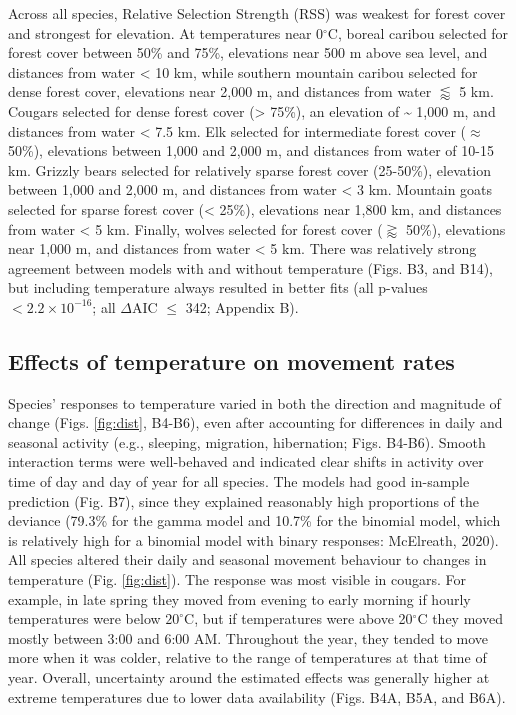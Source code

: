 \documentclass[
  12pt,
]{article}
\begin{document}
Across all species, Relative Selection Strength (RSS) was weakest for forest cover and strongest for elevation. At temperatures near 0\(^\circ\)C, boreal caribou selected for forest cover between 50\% and 75\%, elevations near 500 m above sea level, and distances from water \textless{} 10 km, while southern mountain caribou selected for dense forest cover, elevations near 2,000 m, and distances from water \(\lessapprox\) 5 km. Cougars selected for dense forest cover (\textgreater{} 75\%), an elevation of \textasciitilde{} 1,000 m, and distances from water \textless{} 7.5 km. Elk selected for intermediate forest cover (\(\approx\) 50\%), elevations between 1,000 and 2,000 m, and distances from water of 10-15 km. Grizzly bears selected for relatively sparse forest cover (25-50\%), elevation between 1,000 and 2,000 m, and distances from water \textless{} 3 km. Mountain goats selected for sparse forest cover (\textless{} 25\%), elevations near 1,800 km, and distances from water \textless{} 5 km. Finally, wolves selected for forest cover (\(\gtrapprox\) 50\%), elevations near 1,000 m, and distances from water \textless{} 5 km. There was relatively strong agreement between models with and without temperature (Figs. B3, and B14), but including temperature always resulted in better fits (all p-values \(< 2.2\times10^{-16}\); all \(\Delta\)AIC \(\le\) 342; Appendix B).

\subsection{Effects of temperature on movement rates}\label{effects-of-temperature-on-movement-rates-1}

\noindent Species' responses to temperature varied in both the direction and magnitude of change (Figs. \ref{fig:dist}, B4-B6), even after accounting for differences in daily and seasonal activity (e.g., sleeping, migration, hibernation; Figs. B4-B6). Smooth interaction terms were well-behaved and indicated clear shifts in activity over time of day and day of year for all species. The models had good in-sample prediction (Fig. B7), since they explained reasonably high proportions of the deviance (79.3\% for the gamma model and 10.7\% for the binomial model, which is relatively high for a binomial model with binary responses: McElreath, 2020). All species altered their daily and seasonal movement behaviour to changes in temperature (Fig. \ref{fig:dist}). The response was most visible in cougars. For example, in late spring they moved from evening to early morning if hourly temperatures were below \(20^\circ\)C, but if temperatures were above 20\(^\circ\)C they moved mostly between 3:00 and 6:00 AM. Throughout the year, they tended to move more when it was colder, relative to the range of temperatures at that time of year. Overall, uncertainty around the estimated effects was generally higher at extreme temperatures due to lower data availability (Figs. B4A, B5A, and B6A).
\end{document}
